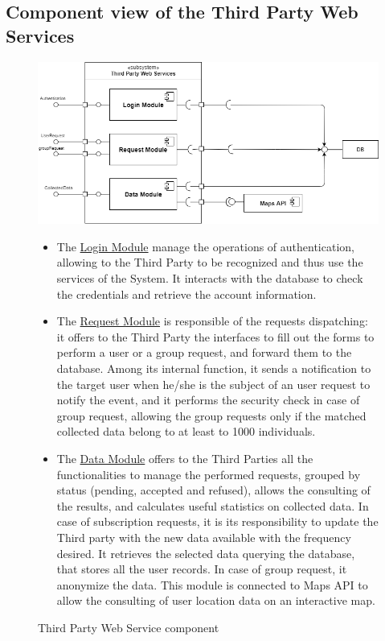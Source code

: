 \subsection{Component view of the Third Party Web Services}
\begin{figure}[H]
    \centering
    \includegraphics[scale=0.5]{./Pictures/ThirdPartyServiceDiagram(1).png}
    \caption{Third Party Web Service component}
    

\begin{itemize}
\item  The \underline{Login Module} manage the operations of authentication, allowing to the Third Party to be recognized and thus use the services of the System. It interacts with the database to check the credentials and retrieve the account information.

    \item The \underline{Request Module} is responsible of
    the requests dispatching: it offers to the Third Party the interfaces to fill out the forms to perform a user or a group request, and  forward them to the database. Among its internal function, it sends a notification to the target user when he/she is the subject of an user request to notify the event, and it performs the security check in case of group request, allowing the group requests only if the matched collected data belong to at least to 1000 individuals.
    
    \item The \underline{Data Module}  offers to the Third Parties all the functionalities to manage the performed requests, grouped by status (pending, accepted and refused), allows the consulting of the results, and calculates useful statistics on collected data. In case of subscription requests, it is its responsibility to update the Third party with the new data available with the frequency desired. It retrieves the selected data querying the database, that stores all the user records. In case of group request, it anonymize the data.
    This module is connected to Maps API to allow the consulting of user location data on an interactive map.
    
    
   \end{itemize} 
   
    
\end{figure}
